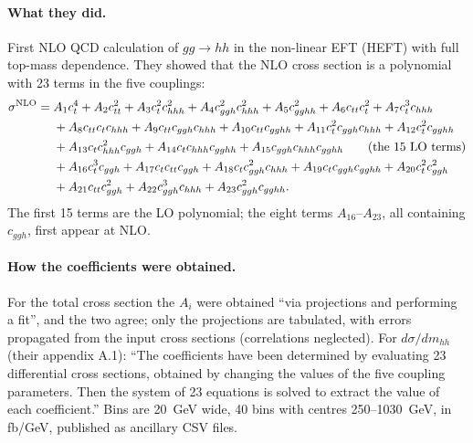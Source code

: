 \paragraph{What they did.} First NLO QCD calculation of $gg\to hh$ in the non-linear EFT
(HEFT) with full top-mass dependence. They showed that the NLO cross section is a polynomial
with 23 terms in the five couplings:
\begin{align}
\sigma^{\rm NLO} = {}&A_1c_t^4 + A_2c_{tt}^2 + A_3c_t^2c_{hhh}^2 + A_4c_{ggh}^2c_{hhh}^2
 + A_5c_{gghh}^2 + A_6c_{tt}c_t^2 + A_7c_t^3c_{hhh} \nonumber\\
 &+ A_8c_{tt}c_tc_{hhh} + A_9c_{tt}c_{ggh}c_{hhh} + A_{10}c_{tt}c_{gghh}
 + A_{11}c_t^2c_{ggh}c_{hhh} + A_{12}c_t^2c_{gghh} \nonumber\\
 &+ A_{13}c_tc_{hhh}^2c_{ggh} + A_{14}c_tc_{hhh}c_{gghh} + A_{15}c_{ggh}c_{hhh}c_{gghh}
 \qquad\text{(the 15 LO terms)} \nonumber\\
 &+ A_{16}c_t^3c_{ggh} + A_{17}c_tc_{tt}c_{ggh} + A_{18}c_tc_{ggh}^2c_{hhh}
 + A_{19}c_tc_{ggh}c_{gghh} + A_{20}c_t^2c_{ggh}^2 \nonumber\\
 &+ A_{21}c_{tt}c_{ggh}^2 + A_{22}c_{ggh}^3c_{hhh} + A_{23}c_{ggh}^2c_{gghh}.
 \label{eq:buchalla}
\end{align}
The first 15 terms are the LO polynomial; the eight terms $A_{16}$--$A_{23}$, all
containing $c_{ggh}$, first appear at NLO.

\paragraph{How the coefficients were obtained.} For the total cross section the $A_i$ were
obtained ``via projections and performing a fit'', and the two agree; only the projections
are tabulated, with errors propagated from the input cross sections (correlations
neglected). For $d\sigma/dm_{hh}$ (their appendix A.1): ``The coefficients have been
determined by evaluating 23 differential cross sections, obtained by changing the values of
the five coupling parameters. Then the system of 23 equations is solved to extract the value
of each coefficient.'' Bins are 20~GeV wide, 40 bins with centres 250--1030~GeV, in fb/GeV,
published as ancillary CSV files.


